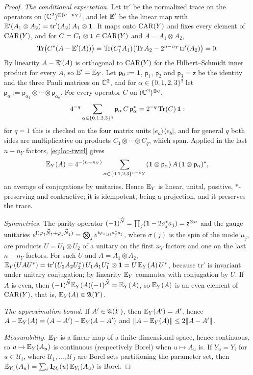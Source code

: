 \begin{proof}
\emph{The conditional expectation.} Let $\mathrm{tr}'$ be the normalized trace on the operators on
$(\mathbb{C}^2)^{\otimes(n-n_Y)}$, and let $\mathbb{E}'$ be the linear map with $\mathbb{E}'(A_1\otimes A_2)=\mathrm{tr}'(A_2)\,A_1\otimes\mathbf{1}$. It maps
onto $\mathrm{CAR}(Y)$ and fixes every element of $\mathrm{CAR}(Y)$, and for $C=C_1\otimes\mathbf{1}\in\mathrm{CAR}(Y)$ and $A=A_1\otimes A_2$,
\[
\operatorname{Tr}\bigl(C^*(A-\mathbb{E}'(A))\bigr)=\operatorname{Tr}(C_1^*A_1)\bigl(\operatorname{Tr} A_2-2^{n-n_Y}\mathrm{tr}'(A_2)\bigr)=0 .
\]
By linearity $A-\mathbb{E}'(A)$ is orthogonal to $\mathrm{CAR}(Y)$ for the Hilbert--Schmidt inner product for every $A$, so
$\mathbb{E}'=\mathbb{E}_Y$. Let $\mathsf p_0:=\mathbf{1}$, $\mathsf p_1$, $\mathsf p_2$ and $\mathsf p_3=\mathsf z$ be the identity and the three
Pauli matrices on $\mathbb{C}^2$, and for $\alpha\in\{0,1,2,3\}^q$ let
$\mathsf p_\alpha:=\mathsf p_{\alpha_1}\otimes\cdots\otimes\mathsf p_{\alpha_q}$. For every operator $C$ on $(\mathbb{C}^2)^{\otimes q}$,
\begin{equation}\label{eq:loc-twirl}
4^{-q}\sum_{\alpha\in\{0,1,2,3\}^q}\mathsf p_\alpha\,C\,\mathsf p_\alpha^*=2^{-q}\operatorname{Tr}(C)\,\mathbf{1} :
\end{equation}
for $q=1$ this is checked on the four matrix units $\lvert e_a\rangle\langle e_b\rvert$, and for general $q$ both
sides are multiplicative on products $C_1\otimes\cdots\otimes C_q$, which span. Applied in the last $n-n_Y$ factors,
\eqref{eq:loc-twirl} gives
\[
\mathbb{E}_Y(A)=4^{-(n-n_Y)}\sum_{\alpha\in\{0,1,2,3\}^{n-n_Y}}(\mathbf{1}\otimes\mathsf p_\alpha)\,A\,(\mathbf{1}\otimes\mathsf p_\alpha)^*,
\]
an average of conjugations by unitaries. Hence $\mathbb{E}_Y$ is linear, unital, positive, $*$-preserving and
contractive; it is idempotent, being a projection, and it preserves the trace.

\emph{Symmetries.} The parity operator $(-1)^{\widehat N}=\prod_j(\mathbf{1}-2a_j^*a_j)=\mathsf z^{\otimes n}$ and the gauge
unitaries $e^{\mathrm{i}(\varphi_{\uparrow}\widehat{N}_{{\uparrow}}+\varphi_{\downarrow}\widehat{N}_{{\downarrow}})}=\bigotimes_je^{\mathrm{i}\varphi_{\sigma(j)}a_j^*a_j}$, where
$\sigma(j)$ is the spin of the mode $\mu_j$, are products $U=U_1\otimes U_2$ of a unitary on the first $n_Y$ factors
and one on the last $n-n_Y$ factors. For such $U$ and $A=A_1\otimes A_2$,
$\mathbb{E}_Y(UAU^*)=\mathrm{tr}'(U_2A_2U_2^*)\,U_1A_1U_1^*\otimes\mathbf{1}=U\,\mathbb{E}_Y(A)\,U^*$, because $\mathrm{tr}'$ is invariant under unitary
conjugation; by linearity $\mathbb{E}_Y$ commutes with conjugation by $U$. If $A$ is even, then
$(-1)^{\widehat N}\mathbb{E}_Y(A)(-1)^{\widehat N}=\mathbb{E}_Y(A)$, so $\mathbb{E}_Y(A)$ is an even element of $\mathrm{CAR}(Y)$, that is,
$\mathbb{E}_Y(A)\in\mathfrak{A}(Y)$.

\emph{The approximation bound.} If $A'\in\mathfrak{A}(Y)$, then $\mathbb{E}_Y(A')=A'$, hence
$A-\mathbb{E}_Y(A)=(A-A')-\mathbb{E}_Y(A-A')$ and $\lVert A-\mathbb{E}_Y(A)\rVert\le2\lVert A-A'\rVert$.

\emph{Measurability.} $\mathbb{E}_Y$ is a linear map of a finite-dimensional space, hence continuous, so
$u\mapsto\mathbb{E}_Y(A_u)$ is continuous (respectively Borel) when $u\mapsto A_u$ is. If $Y_u=Y_i$ for $u\in\mathcal U_i$,
where $\mathcal U_1,\dots,\mathcal U_J$ are Borel sets partitioning the parameter set, then
$\mathbb{E}_{Y_u}(A_u)=\sum_i\mathbf{1}_{\mathcal U_i}(u)\,\mathbb{E}_{Y_i}(A_u)$ is Borel.
\end{proof}

